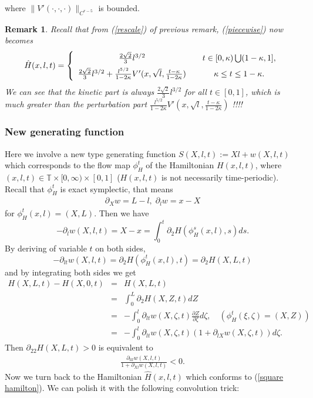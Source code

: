 \documentclass{amsart}
\newtheorem{rmk}[thm]{Remark}
\begin{document}
where $\|V'(\cdot,\cdot,\cdot)\|_{C^{r-5}}$ is bounded.
\begin{rmk}
Recall that from (\ref{rescale}) of previous remark, (\ref{piecewise}) now becomes
\begin{eqnarray}\label{square hamilton}
\hat{H}(x,l,t)=\left\{
\begin{array}{cccccc}
\frac{2\sqrt{2}}{3}l^{3/2} & & t\in[0,\kappa)\bigcup(1-\kappa,1],\vspace{5pt}\\
\frac{2\sqrt{2}}{3}l^{3/2} +\frac{l^{5/2}}{1-2\kappa}V'(x,\sqrt{l},\frac{t-\kappa}{1-2\kappa})& & \kappa\leq t\leq 1-\kappa.
\end{array}\right.
\end{eqnarray}
We can see that the kinetic part is always $\frac{2\sqrt{2}}{3}l^{3/2}$ for all $t\in[0,1]$, which is much greater than the perturbation part $\frac{l^{5/2}}{1-2\kappa}V'(x,\sqrt{l},\frac{t-\kappa}{1-2\kappa})$ !!!!\\
\end{rmk}

\subsubsection{New generating function}
 Here we involve a new type generating function $S(X,l,t):=Xl+w(X,l,t)$ which corresponds to the flow map $\phi_H^t$ of the Hamiltonian $H(x,l,t)$, where $(x,l,t)\in{\mathbb{T}}\times[0,\infty)\times[0,1]$ ($H(x,l,t)$ is not necessarily time-periodic). Recall that $\phi_H^t$ is exact symplectic, that means 
\begin{eqnarray}\label{general}
\partial_Xw=L-l,\;\partial_lw=x-X
\end{eqnarray}
for $\phi_H^t(x,l)=(X,L)$. 
{ Then we have
\[
-\partial_lw(X,l,t)=X-x=\int_0^t\partial_2H(\phi_H^s(x,l),s)ds.
\]
By deriving of variable $t$ on both sides, 
\[
-\partial_{lt}w(X,l,t)=\partial_2H(\phi_H^t(x,l),t)=\partial_2H(X,L,t)
\]
and by integrating both sides we get
\begin{eqnarray}\label{connection}
H(X,L,t)-H(X,0,t)&=&H(X,L,t)\nonumber\\
&=&\int_0^L\partial_2H(X,Z,t)dZ\nonumber\\
&=&-\int_0^l\partial_{lt}w(X,\zeta,t)\frac{\partial Z}{\partial\zeta}d\zeta,\quad(\phi_H^t(\xi,\zeta)=(X,Z))\nonumber\\
&=&-\int_0^l\partial_{lt}w(X,\zeta,t)(1+\partial_{lX}w(X,\zeta,t))d\zeta.
\end{eqnarray}
Then  $\partial_{22}H(X,L,t)>0$ is equivalent to
\begin{eqnarray}\label{positive-defn}
\frac{\partial_{tll}w(X,l,t)}{1+\partial_{Xl}w(X,l,t)}<0.
\end{eqnarray}
}
Now we turn back to the Hamiltonian $\hat{H}(x,l,t)$ which conforms to (\ref{square hamilton}). We can polish it with the following convolution trick:\\
\end{document}
